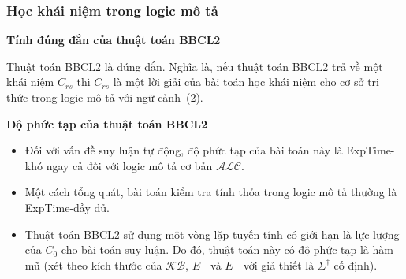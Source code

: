 \documentclass[fleqn]{beamer}
\newcommand{\SigmaDag}	{\Sigma^\dag}
\newcommand{\KB}		{\mathcal{KB}}
\newcommand{\ALC}		{$\mathcal{ALC}$\xspace}
\newcommand{\BBCLearnS}		{BBCL2\xspace}
\newcommand{\EXPTIME}	{{\sc ExpTime}\xspace}
\begin{document}
\begin{frame}\frametitle{\bf Học khái niệm trong logic mô tả}
\textbf{Tính đúng đắn của thuật toán \BBCLearnS}
\vspace{1.0ex}
	
	Thuật toán \BBCLearnS là đúng đắn. Nghĩa là, nếu thuật toán \BBCLearnS trả về một khái niệm $C_{rs}$ thì $C_{rs}$ là một lời giải của bài toán học khái niệm cho cơ sở tri thức trong logic mô tả với ngữ cảnh~(2).
\vspace{2.0ex}

\textbf{Độ phức tạp của thuật toán \BBCLearnS}
\vspace{1.0ex}
\begin{itemize}
	\item Đối với vấn đề suy luận tự động, độ phức tạp của bài toán này là \EXPTIME-khó ngay cả đối với logic mô tả cơ bản \ALC. 
\vspace{1.0ex}
	
	\item Một cách tổng quát, bài toán kiểm tra tính thỏa trong logic mô tả thường là \EXPTIME-đầy đủ.
\vspace{1.0ex}
	
	\item Thuật toán BBCL2 sử dụng một vòng lặp tuyến tính có giới hạn là lực lượng của $C_0$ cho bài toán suy luận. Do đó, thuật toán này có độ phức tạp là hàm mũ (xét theo kích thước của $\KB$, $E^+$ và $E^-$ với giả thiết là $\SigmaDag$ cố định).
\end{itemize}
\end{frame}
\end{document}
